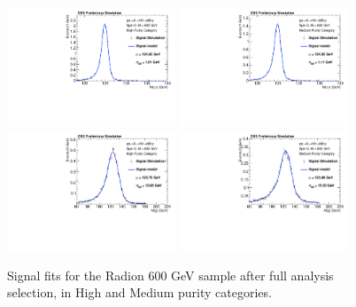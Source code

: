 \begin{figure}[thb]
  \centering
  \includegraphics[width=0.45\textwidth]{figures/sec-signals/Rad600_signal_fit_mgg_cat0}\hfil
  \includegraphics[width=0.45\textwidth]{figures/sec-signals/Rad600_signal_fit_mgg_cat1}\hfil
  \includegraphics[width=0.45\textwidth]{figures/sec-signals/Rad600_signal_fit_mjj_cat0}\hfil
  \includegraphics[width=0.45\textwidth]{figures/sec-signals/Rad600_signal_fit_mjj_cat1}\hfil
  \caption{Signal fits for the Radion 600 GeV sample after full analysis selection, in High and Medium purity categories.}
  \label{fig:rad600}
\end{figure}

